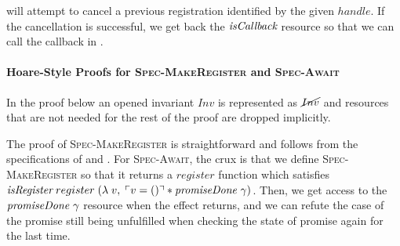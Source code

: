  will attempt to cancel a previous registration identified by the given \(handle\).
If the cancellation is successful, we get back the \(\emph{isCallback}{}\) resource so that we can call the callback in .

\paragraph*{Hoare-Style Proofs for \textsc{Spec-MakeRegister} and \textsc{Spec-Await}}

In the proof below an opened invariant \(Inv\) is represented as \(\cancel{Inv}\) and resources that are not needed for the rest of the proof are dropped implicitly.

The proof of \textsc{Spec-MakeRegister} is straightforward and follows from the specifications of  and .
For \textsc{Spec-Await}, the crux is that we define \textsc{Spec-MakeRegister} so that it returns a \(register\) function which satisfies \(\emph{isRegister}{}\; register\; (\lambda\; v,\; \ulcorner v = () \urcorner \ast \emph{promiseDone}~\gamma{})\).
Then, we get access to the \(\emph{promiseDone}~\gamma{}\) resource when the \esuspend{} effect returns, and we can refute the case of the promise still being unfulfilled when checking the state of promise again for the last time.


